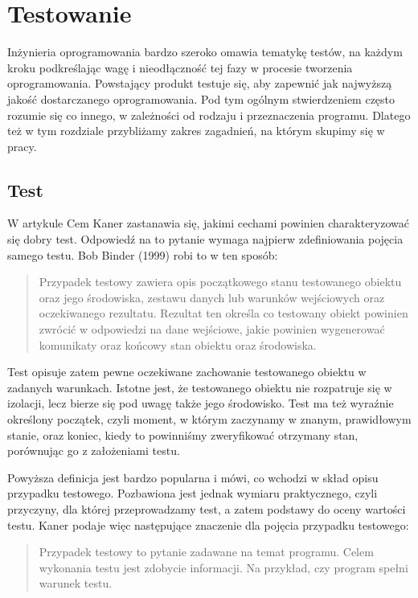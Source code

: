 \documentclass[00-praca-magisterska.tex]{subfiles}
\begin{document}
\chapter{Testowanie}
\label{testowanie}

Inżynieria oprogramowania bardzo szeroko omawia tematykę testów, na każdym
kroku podkreślając wagę i nieodłączność tej fazy w procesie tworzenia
oprogramowania.  Powstający produkt testuje się, aby zapewnić jak najwyższą
jakość dostarczanego oprogramowania. Pod tym ogólnym stwierdzeniem często
rozumie się co innego, w zależności od rodzaju i przeznaczenia programu.
Dlatego też w tym rozdziale przybliżamy zakres zagadnień, na którym skupimy się
w pracy.

\section{Test}
\label{test}

W artykule \cite{good-test} Cem Kaner zastanawia się, jakimi cechami powinien
charakteryzować się dobry test.  Odpowiedź na to pytanie wymaga najpierw
zdefiniowania pojęcia samego testu. Bob Binder (1999) robi to w ten sposób:

\begin{quote}
Przypadek testowy zawiera opis początkowego stanu testowanego obiektu oraz jego
środowiska, zestawu danych lub warunków wejściowych oraz oczekiwanego
rezultatu. Rezultat ten określa co testowany obiekt powinien zwrócić w
odpowiedzi na dane wejściowe, jakie powinien wygenerować komunikaty oraz
końcowy stan obiektu oraz środowiska.
\end{quote}

Test opisuje zatem pewne oczekiwane zachowanie testowanego obiektu w zadanych
warunkach. Istotne jest, że testowanego obiektu nie rozpatruje się w izolacji,
lecz bierze się pod uwagę także jego środowisko. Test ma też wyraźnie określony
początek, czyli moment, w którym zaczynamy w znanym, prawidłowym stanie, oraz
koniec, kiedy to powinniśmy zweryfikować otrzymany stan, porównując go z
założeniami testu.

Powyższa definicja jest bardzo popularna i mówi, co wchodzi w skład opisu
przypadku testowego. Pozbawiona jest jednak wymiaru praktycznego, czyli
przyczyny, dla której przeprowadzamy test, a zatem podstawy do oceny wartości
testu. Kaner \cite{good-test} podaje więc następujące znaczenie dla pojęcia
przypadku testowego:

\begin{quote}Przypadek testowy to pytanie zadawane na temat programu. Celem
wykonania testu jest zdobycie informacji. Na przykład, czy program spełni
warunek testu.
\end{quote}
\end{document}
